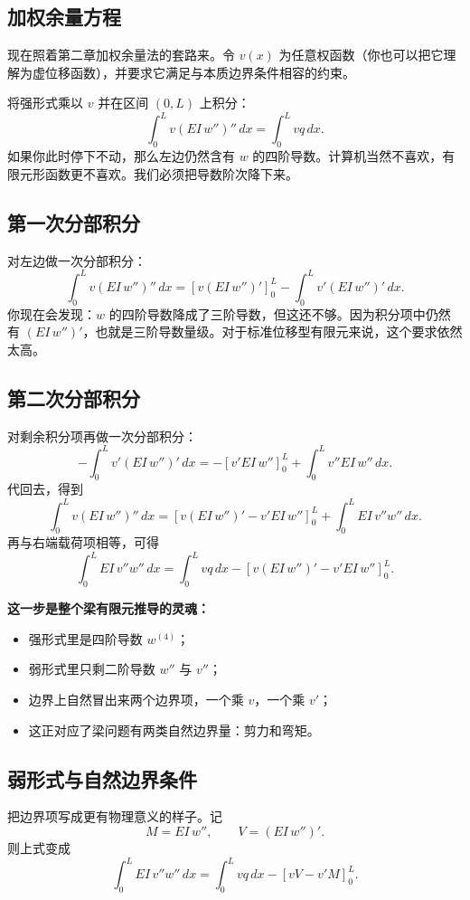 \documentclass[11pt, a4paper, UTF8]{ctexart}
\begin{document}
\subsection{加权余量方程}
现在照着第二章加权余量法的套路来。令 $v(x)$ 为任意权函数（你也可以把它理解为虚位移函数），并要求它满足与本质边界条件相容的约束。

将强形式乘以 $v$ 并在区间 $(0,L)$ 上积分：
\[
\int_0^L v (EI\, w'')''\, dx = \int_0^L v q\, dx.
\]
如果你此时停下不动，那么左边仍然含有 $w$ 的四阶导数。计算机当然不喜欢，有限元形函数更不喜欢。我们必须把导数阶次降下来。

\subsection{第一次分部积分}
对左边做一次分部积分：
\[
\int_0^L v (EI\, w'')''\, dx
=
\left[ v (EI\, w'')' \right]_0^L
-
\int_0^L v' (EI\, w'')'\, dx.
\]
你现在会发现：$w$ 的四阶导数降成了三阶导数，但这还不够。因为积分项中仍然有 $(EI\,w'')'$，也就是三阶导数量级。对于标准位移型有限元来说，这个要求依然太高。

\subsection{第二次分部积分}
对剩余积分项再做一次分部积分：
\[
-\int_0^L v' (EI\, w'')'\, dx
=
-\left[ v' EI\, w'' \right]_0^L
+
\int_0^L v'' EI\, w''\, dx.
\]
代回去，得到
\[
\int_0^L v (EI\, w'')''\, dx
=
\left[ v (EI\, w'')' - v' EI\, w'' \right]_0^L
+
\int_0^L EI\, v'' w''\, dx.
\]
再与右端载荷项相等，可得
\[
\int_0^L EI\, v'' w''\, dx
=
\int_0^L v q\, dx
-
\left[ v (EI\, w'')' - v' EI\, w'' \right]_0^L.
\]

\textbf{这一步是整个梁有限元推导的灵魂：}
\begin{itemize}
    \item 强形式里是四阶导数 $w^{(4)}$；
    \item 弱形式里只剩二阶导数 $w''$ 与 $v''$；
    \item 边界上自然冒出来两个边界项，一个乘 $v$，一个乘 $v'$；
    \item 这正对应了梁问题有两类自然边界量：剪力和弯矩。
\end{itemize}

\subsection{弱形式与自然边界条件}
把边界项写成更有物理意义的样子。记
\[
M = EI\, w'', \qquad V = (EI\, w'')'.
\]
则上式变成
\[
\int_0^L EI\, v'' w''\, dx
=
\int_0^L v q\, dx
-
\left[ v V - v' M \right]_0^L.
\]
\end{document}

